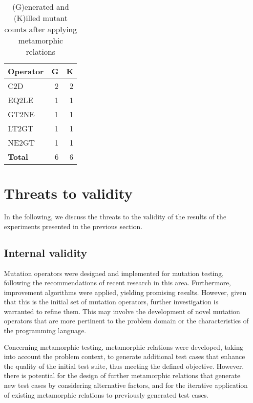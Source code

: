 

\begin{table}
    \centering
    \begin{tabular}{lrr}
    \toprule
    \textbf{Operator} & \textbf{G} &  \textbf{K} \\
    \midrule
C2D         & 2 & 2 \\
EQ2LE   & 1     & 1 \\
GT2NE   & 1     & 1 \\
LT2GT   & 1     & 1 \\
NE2GT   & 1     & 1 \\

    \midrule
    \textbf{Total} & 6 & 6  \\
    \bottomrule
    \end{tabular}
    \caption{(G)enerated and (K)illed mutant counts after applying metamorphic relations}
    \label{tab:mutant-counts2}
\end{table}


\section{Threats to validity}
\label{sec:threat}
In the following, we discuss the threats to the validity of the results of the experiments presented in the
previous section.

\subsection{Internal validity}
Mutation operators were designed and implemented for mutation testing, following the recommendations of recent research in this area. Furthermore, improvement algorithms were applied, yielding promising results. However, given that this is the initial set of mutation operators, further investigation is warranted to refine them. This may involve the development of novel mutation operators that are more pertinent to the problem domain or the characteristics of the programming language.

Concerning metamorphic testing, metamorphic relations were developed, taking into account the problem context, to generate additional test cases that enhance the quality of the initial test suite, thus meeting the defined objective. However, there is potential for the design of further metamorphic relations that generate new test cases by considering alternative factors, and for the iterative application of existing metamorphic relations to previously generated test cases.

